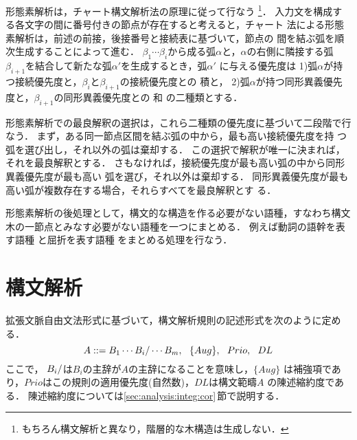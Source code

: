 形態素解析は，チャート構文解析法\cite{Kay80}の原理に従って行なう
\footnote{もちろん構文解析と異なり，階層的な木構造は生成しない．}．
入力文を構成する各文字の間に番号付きの節点が存在すると考えると，チャート
法による形態素解析は，前述の前接，後接番号と接続表に基づいて，節点の
間を結ぶ弧を順次生成することによって進む．
$\beta_1 \cdots \beta_i$から成る弧$\alpha$と，$\alpha$の右側に隣接する弧
$\beta_{i+1}$を結合して新たな弧$\alpha\prime$を生成するとき，弧$\alpha\prime$
に与える優先度は
1)弧$\alpha$が持つ接続優先度と，$\beta_i$と$\beta_{i+1}$の接続優先度との
積と，
2)弧$\alpha$が持つ同形異義優先度と，$\beta_{i+1}$の同形異義優先度との
和
の二種類とする．

形態素解析での最良解釈の選択は，これら二種類の優先度に基づいて二段階で行
なう．
まず，ある同一節点区間を結ぶ弧の中から，最も高い接続優先度を持
つ弧を選び出し，それ以外の弧は棄却する．
この選択で解釈が唯一に決まれば，それを最良解釈とする．
さもなければ，接続優先度が最も高い弧の中から同形異義優先度が最も高い
弧を選び，それ以外は棄却する．
同形異義優先度が最も高い弧が複数存在する場合，それらすべてを最良解釈とす
る．

形態素解析の後処理として，構文的な構造を作る必要がない語種，すなわち構文
木の一節点とみなす必要がない語種を一つにまとめる．
例えば動詞の語幹を表す語種
と屈折を表す語種
をまとめる処理を行なう．

\section{構文解析}
\label{sec:analysis:syn}

拡張文脈自由文法形式に基づいて，構文解析規則の記述形式を次のように定める．
\begin{equation}
A ::= B_1 \cdots B_i/\head \cdots B_m,\ \ \{Aug\},\ \ Prio,\ \ DL
\label{eq:syn_rule}
\end{equation}
ここで， $B_i/$は$B_i$の主辞が$A$の主辞になることを意味し，$\{Aug\}$
は補強項であり，$Prio$はこの規則の適用優先度(自然数)，$DL$は構文範疇$A$
の陳述縮約度\cite{Jelinek95}である．
陳述縮約度については\ref{sec:analysis:integ:cor}\,節で説明する．

